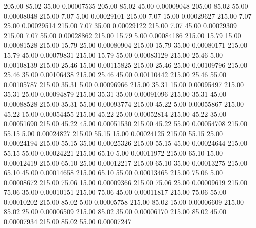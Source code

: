     205.00     85.02     35.00     0.00007535
    205.00     85.02     45.00     0.00009048
    205.00     85.02     55.00     0.00008048
    215.00      7.07      5.00     0.00029101
    215.00      7.07     15.00     0.00029627
    215.00      7.07     25.00     0.00029514
    215.00      7.07     35.00     0.00029122
    215.00      7.07     45.00     0.00029309
    215.00      7.07     55.00     0.00028862
    215.00     15.79      5.00     0.00084186
    215.00     15.79     15.00     0.00081528
    215.00     15.79     25.00     0.00080904
    215.00     15.79     35.00     0.00080171
    215.00     15.79     45.00     0.00079831
    215.00     15.79     55.00     0.00083129
    215.00     25.46      5.00     0.00108139
    215.00     25.46     15.00     0.00115825
    215.00     25.46     25.00     0.00109796
    215.00     25.46     35.00     0.00106438
    215.00     25.46     45.00     0.00110442
    215.00     25.46     55.00     0.00105787
    215.00     35.31      5.00     0.00096966
    215.00     35.31     15.00     0.00095497
    215.00     35.31     25.00     0.00094879
    215.00     35.31     35.00     0.00091096
    215.00     35.31     45.00     0.00088528
    215.00     35.31     55.00     0.00093774
    215.00     45.22      5.00     0.00055867
    215.00     45.22     15.00     0.00054455
    215.00     45.22     25.00     0.00052814
    215.00     45.22     35.00     0.00051690
    215.00     45.22     45.00     0.00051530
    215.00     45.22     55.00     0.00054708
    215.00     55.15      5.00     0.00024827
    215.00     55.15     15.00     0.00024125
    215.00     55.15     25.00     0.00024194
    215.00     55.15     35.00     0.00025326
    215.00     55.15     45.00     0.00024644
    215.00     55.15     55.00     0.00024221
    215.00     65.10      5.00     0.00011972
    215.00     65.10     15.00     0.00012419
    215.00     65.10     25.00     0.00012217
    215.00     65.10     35.00     0.00013275
    215.00     65.10     45.00     0.00014658
    215.00     65.10     55.00     0.00013465
    215.00     75.06      5.00     0.00008672
    215.00     75.06     15.00     0.00009366
    215.00     75.06     25.00     0.00009619
    215.00     75.06     35.00     0.00010151
    215.00     75.06     45.00     0.00011817
    215.00     75.06     55.00     0.00010202
    215.00     85.02      5.00     0.00005758
    215.00     85.02     15.00     0.00006609
    215.00     85.02     25.00     0.00006509
    215.00     85.02     35.00     0.00006170
    215.00     85.02     45.00     0.00007934
    215.00     85.02     55.00     0.00007247

